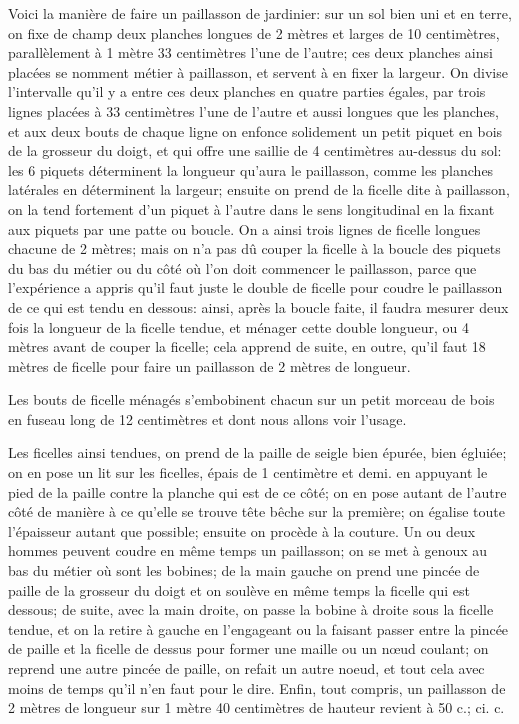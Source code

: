 \documentclass[10pt,a4paper]{book}
\begin{document}
Voici la manière de faire un paillasson de jardinier: sur un sol bien uni et en terre, on fixe de champ deux planches longues de 2 mètres et larges de 10 centimètres, parallèlement à 1 mètre 33 centimètres l'une de l'autre; ces deux planches ainsi placées se nomment métier à paillasson, et servent à en fixer la largeur. On divise l'intervalle qu'il y a entre ces deux planches en quatre parties égales, par trois lignes placées à 33 centimètres l'une de l'autre et aussi longues que les planches, et aux deux bouts de chaque ligne on enfonce solidement un petit piquet en bois de la grosseur du doigt, et qui offre une saillie de 4 centimètres au-dessus du sol: les 6 piquets déterminent la longueur qu'aura le paillasson, comme les planches latérales en déterminent la largeur; ensuite on prend de la ficelle dite à paillasson, on la tend fortement d'un piquet à l'autre dans le sens longitudinal en la fixant aux piquets par une patte ou boucle. On a ainsi trois lignes de ficelle longues chacune de 2 mètres; mais on n'a pas dû couper la ficelle à la boucle des piquets du bas du métier ou du côté où l'on doit commencer le paillasson, parce que l'expérience a appris qu'il faut juste le double de ficelle pour coudre le paillasson de ce qui est tendu en dessous: ainsi, après la boucle faite, il faudra mesurer deux fois la longueur de la ficelle tendue, et ménager cette double longueur, ou 4 mètres avant de couper la ficelle; cela apprend de suite, en outre, qu'il faut 18 mètres de ficelle pour faire un paillasson de 2 mètres de longueur.

Les bouts de ficelle ménagés s'embobinent chacun sur un petit morceau de bois en fuseau long de 12 centimètres et dont nous allons voir l'usage.

Les ficelles ainsi tendues, on prend de la paille de seigle bien épurée, bien égluiée; on en pose un lit sur les ficelles, épais de 1 centimètre et demi. en appuyant le pied de la paille contre la planche qui est de ce côté; on en pose autant de l'autre côté de manière à ce qu'elle se trouve tête bêche sur la première; on égalise toute l'épaisseur autant que possible; ensuite on procède à la couture. Un ou deux hommes peuvent coudre en même temps un paillasson; on se met à genoux au bas du métier où sont les bobines; de la main gauche on prend une pincée de paille de la grosseur du doigt et on soulève en même temps la ficelle qui est dessous; de suite, avec la main droite, on passe la bobine à droite sous la ficelle tendue, et on la retire à gauche en l'engageant ou la faisant passer entre la pincée de paille et la ficelle de dessus pour former une maille ou un nœud coulant; on reprend une autre pincée de paille, on refait un autre noeud, et tout cela avec moins de temps qu'il n'en faut pour le dire. Enfin, tout compris, un paillasson de 2 mètres de longueur sur 1 mètre 40 centimètres de hauteur revient à 50 c.; ci. c.
\end{document}
